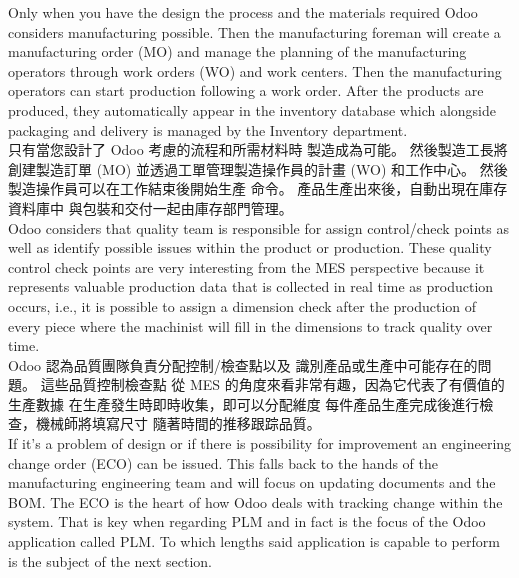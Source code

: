 \fontsize{12}{2.5pt}\sectionef 
 {Only when you have the design the process and the materials required Odoo considers
manufacturing possible. Then the manufacturing foreman will create a manufacturing order
(MO) and manage the planning of the manufacturing operators through work orders (WO)
and work centers. Then the manufacturing operators can start production following a work
order. After the products are produced, they automatically appear in the inventory database
which alongside packaging and delivery is managed by the Inventory department.}\\[1pt]

\fontsize{12}{2.5pt}\sectionef  
{只有當您設計了 Odoo 考慮的流程和所需材料時
製造成為可能。 然後製造工長將創建製造訂單
(MO) 並透過工單管理製造操作員的計畫 (WO)
和工作中心。 然後製造操作員可以在工作結束後開始生產
命令。 產品生產出來後，自動出現在庫存資料庫中
與包裝和交付一起由庫存部門管理。}
\\[15pt]


\fontsize{12}{2.5pt}\sectionef 
 {Odoo considers that quality team is responsible for assign control/check points as well as
identify possible issues within the product or production. These quality control check points
are very interesting from the MES perspective because it represents valuable production data
that is collected in real time as production occurs, i.e., it is possible to assign a dimension
check after the production of every piece where the machinist will fill in the dimensions to
track quality over time.}\\[1pt]

\fontsize{12}{2.5pt}\sectionef  
{Odoo 認為品質團隊負責分配控制/檢查點以及
識別產品或生產中可能存在的問題。 這些品質控制檢查點
從 MES 的角度來看非常有趣，因為它代表了有價值的生產數據
在生產發生時即時收集，即可以分配維度
每件產品生產完成後進行檢查，機械師將填寫尺寸
隨著時間的推移跟踪品質。}
\\[15pt]


\fontsize{12}{2.5pt}\sectionef 
 {If it's a problem of design or if there is possibility for improvement an engineering change
order (ECO) can be issued. This falls back to the hands of the manufacturing engineering
team and will focus on updating documents and the BOM. The ECO is the heart of how Odoo
deals with tracking change within the system. That is key when regarding PLM and in fact is
the focus of the Odoo application called PLM. To which lengths said application is capable
to perform is the subject of the next section.}\\[1pt]

